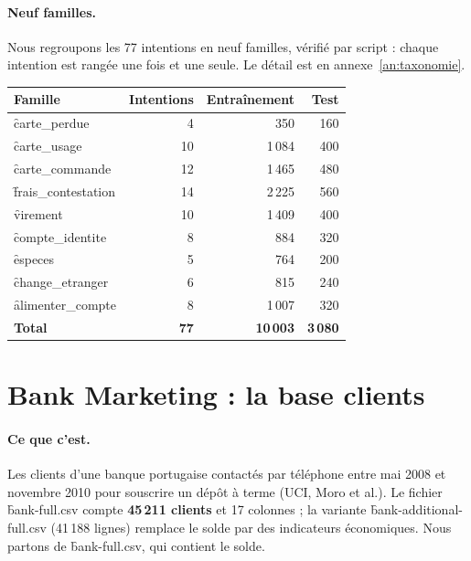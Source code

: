 \paragraph{Neuf familles.} Nous regroupons les 77 intentions en neuf familles, vérifié par script :
chaque intention est rangée une fois et une seule. Le détail est en annexe~\ref{an:taxonomie}.

\begin{center}\small
\begin{tabular}{@{}l r r r@{}}
\toprule
\textbf{Famille} & \textbf{Intentions} & \textbf{Entraînement} & \textbf{Test} \\
\midrule
\f{carte\_perdue} & 4 & 350 & 160 \\
\f{carte\_usage} & 10 & 1\,084 & 400 \\
\f{carte\_commande} & 12 & 1\,465 & 480 \\
\f{frais\_contestation} & 14 & 2\,225 & 560 \\
\f{virement} & 10 & 1\,409 & 400 \\
\f{compte\_identite} & 8 & 884 & 320 \\
\f{especes} & 5 & 764 & 200 \\
\f{change\_etranger} & 6 & 815 & 240 \\
\f{alimenter\_compte} & 8 & 1\,007 & 320 \\
\midrule
\textbf{Total} & \textbf{77} & \textbf{10\,003} & \textbf{3\,080} \\
\bottomrule
\end{tabular}
\end{center}

\section{Bank Marketing : la base clients}

\paragraph{Ce que c'est.} Les clients d'une banque portugaise contactés par téléphone entre mai 2008
et novembre 2010 pour souscrire un dépôt à terme (UCI, Moro et al.). Le fichier
\f{bank-full.csv} compte \textbf{45\,211 clients} et 17 colonnes ; la variante
\f{bank-additional-full.csv} (41\,188 lignes) remplace le solde par des indicateurs économiques.
Nous partons de \f{bank-full.csv}, qui contient le solde.

